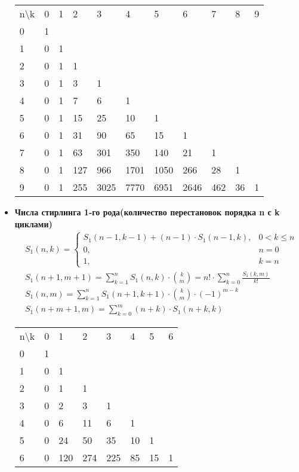 \documentclass[10pt]{article}
\begin{document}
\begin{itemize}
\begin{longtable}[c]{lllllllllll}
n\textbackslash{}k & 0 & 1 & 2 & 3 & 4 & 5 & 6 & 7 & 8 & 9
\\
0 & 1 & & & & & & & & &
\\
1 & 0 & 1 & & & & & & & &
\\
2 & 0 & 1 & 1 & & & & & & &
\\
3 & 0 & 1 & 3 & 1 & & & & & &
\\
4 & 0 & 1 & 7 & 6 & 1 & & & & &
\\
5 & 0 & 1 & 15 & 25 & 10 & 1 & & & &
\\
6 & 0 & 1 & 31 & 90 & 65 & 15 & 1 & & &
\\
7 & 0 & 1 & 63 & 301 & 350 & 140 & 21 & 1 & &
\\
8 & 0 & 1 & 127 & 966 & 1701 & 1050 & 266 & 28 & 1 &
\\
9 & 0 & 1 & 255 & 3025 & 7770 & 6951 & 2646 & 462 & 36 & 1
\\

\end{longtable}
\item \textbf{Числа стирлинга 1-го рода(количество перестановок порядка n с k циклами)}
\begin{equation}
  \begin{split}
    &S_1(n, k) = 
    \left\{
    \begin{array}{cc}
    S_1(n-1, k-1) + (n - 1) \cdot S_1(n-1, k), & 0 < k \le n\\
    0, & n = 0\\
    1, & k = n
    \end{array}
    \right.\\
    &S_1(n + 1, m + 1) = \sum\limits_{k = 1}^n S_1(n, k) \cdot \binom{k}{m} = n! \cdot \sum\limits_{k=0}^n\frac{S_1(k, m)}{k!}\\
    &S_1(n, m) = \sum\limits_{k=1}^n S_1(n + 1, k + 1) \cdot \binom{k}{m} \cdot (-1)^{m - k}\\
    &S_1(n + m + 1, m) = \sum\limits_{k=0}^m (n + k) \cdot S_1(n + k, k)
  \end{split}
\end{equation}
\begin{longtable}[c]{llllllll}

n\textbackslash{}k & 0 & 1 & 2 & 3 & 4 & 5 & 6
\\

0 & 1 & & & & & &
\\
1 & 0 & 1 & & & & &
\\
2 & 0 & 1 & 1 & & & &
\\
3 & 0 & 2 & 3 & 1 & & &
\\
4 & 0 & 6 & 11 & 6 & 1 & &
\\
5 & 0 & 24 & 50 & 35 & 10 & 1 &
\\
6 & 0 & 120 & 274 & 225 & 85 & 15 & 1
\\


\end{longtable}
\end{itemize}
\end{document}
